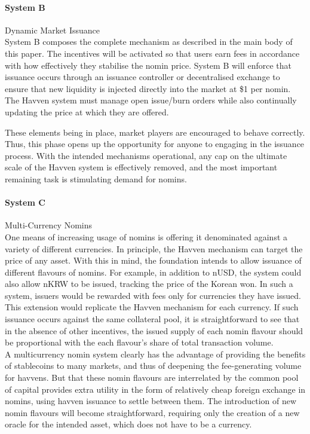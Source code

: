 \paragraph{System B} Dynamic Market Issuance \\

\noindent System B composes the complete mechanism as described in the main body
of this paper. The incentives will be activated so that users earn fees in
accordance with how effectively they stabilise the nomin price. 
System B will enforce that issuance occurs through an issuance controller or
decentralised exchange to ensure that new liquidity is injected directly
into the market at \$1 per nomin. The Havven system must manage open
issue/burn orders while also continually updating the price at which they are
offered.

\noindent These elements being in place, market players are encouraged to behave correctly.
Thus, this phase opens up the opportunity for anyone to engaging in the issuance process.
With the intended mechanisms operational, any cap on the ultimate scale of the Havven system
is effectively removed, and the most important remaining task is stimulating demand for nomins. \\


\paragraph{System C} Multi-Currency Nomins \\

\noindent One means of increasing usage of nomins is offering it
denominated against a variety of different currencies.
In principle, the Havven mechanism can target the price of any asset.
With this in mind, the foundation intends to allow issuance
of different flavours of nomins. For example, in addition to 
nUSD, the system could also allow nKRW to be issued, tracking
the price of the Korean won. In such a system, issuers would be
rewarded with fees only for currencies they have issued.
This extension would replicate the Havven mechanism for each currency. 
If such issuance occurs against the same collateral pool, it is
straightforward to see that in the absence of other incentives,
the issued supply of each nomin flavour should be proportional with the
each flavour's share of total transaction volume. \\

\noindent A multicurrency nomin system clearly has the advantage of providing
the benefits of stablecoins to many markets, and thus of deepening
the fee-generating volume for havvens. But that these nomin flavours
are interrelated by the common pool of capital provides extra utility
in the form of relatively cheap foreign exchange in nomins, using 
havven issuance to settle between them.
The introduction of new nomin flavours will become straightforward,
requiring only the creation of a new oracle for the intended asset,
which does not have to be a currency. \\

